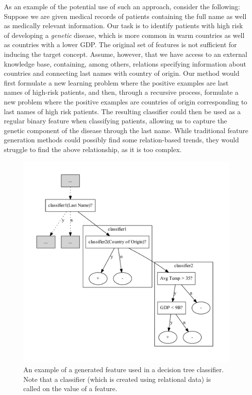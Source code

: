 \documentclass{article}
\theoremstyle{definition}
\begin{document}
As an example of the potential use of such an approach, consider the following:
Suppose we are given medical records of patients containing the full name as well as medically relevant information.
Our task is to identify patients with high risk of developing a \emph{genetic} disease, which is more common in warm countries as well as countries with a lower GDP.
The original set of features is not sufficient for inducing the target concept.  Assume, however, that we have access to an external knowledge base, containing, among others, relations specifying information about countries and connecting last names with country of origin.
Our method would first formulate a new learning problem where the positive examples are last names of high-risk patients, and then, through a recursive process, formulate a new problem where the positive examples are countries of origin corresponding to last names of high risk patients. The resulting classifier could then be used as a regular binary feature when classifying patients, allowing us to capture the genetic component of the disease through the last name. While traditional feature generation methods could possibly find some relation-based trends, they would struggle to find the above relationship, as it is too complex.

\begin{figure}[H]
	\centering
	\includegraphics[width=\linewidth]{example.pdf}
	\caption{An example of a generated feature used in a decision tree classifier. Note that a classifier (which is created using relational data) is called on the value of a feature.}
	\label{fig:example}
\end{figure}
\end{document}
